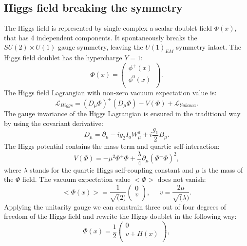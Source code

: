 \subsection{Higgs field breaking the symmetry}
\label{sec:symmetry_breaking}
The Higgs field is represented by single complex a scalar doublet field $\Phi(x)$, that has 4 independent components. It spontaneously breaks the  $SU(2)\times U(1)$ gauge symmetry, leaving the $U(1)_{EM}$ symmetry intact. The Higgs field doublet has the hypercharge $Y=1$:
  \begin{equation}
\Phi(x) = \begin{pmatrix}
\phi^{+}(x)  \\
\phi^{0}(x)  \\
\end{pmatrix}.
\end{equation}
The Higgs field Lagrangian with non-zero vacuum expectation value is: 
 \begin{equation}
\mathcal{L}_{Higgs} = (D_{\mu}\Phi)^+(D_{\mu}\Phi)-V(\Phi)+\mathcal{L}_{Yukawa}.
\end{equation}
The gauge invariance of the Higgs Lagrangian is ensured in the traditional way by using the covariant derivative:
 \begin{equation}
D_{\mu} = \partial_{\mu} - ig_2I_aW^a_{\mu}+i\frac{g_1}{2}B_{\mu}.
\end{equation}
The Higgs potential contains the mass term and quartic self-interaction:
 \begin{equation}
V(\Phi) = -\mu^2 \Phi^+\Phi + \frac{\lambda}{4}\partial_{\mu}(\Phi^+\Phi)^2,
\end{equation}
where $\lambda$ stands for the quartic Higgs self-coupling constant and $\mu$ is the mass of the $\Phi$ field. The vacuum expectation value $<\Phi>$ does not vanish:
  \begin{equation}
<\Phi(x)> = \frac{1}{\sqrt(2)}\begin{pmatrix}
0  \\
v \\
\end{pmatrix},\;\;\;\;\; 
v = \frac{2\mu}{\sqrt(\lambda)}.
\end{equation}
Applying the unitarity gauge \cite{weinberg2} we can constrain three out of four degrees of freedom of the Higgs field and rewrite the Higgs doublet in the following way:
  \begin{equation}
 \Phi(x) = \frac{1}{2}\begin{pmatrix}
 	0 \\
 	v+H(x)  \\
 \end{pmatrix},
  \end{equation}
